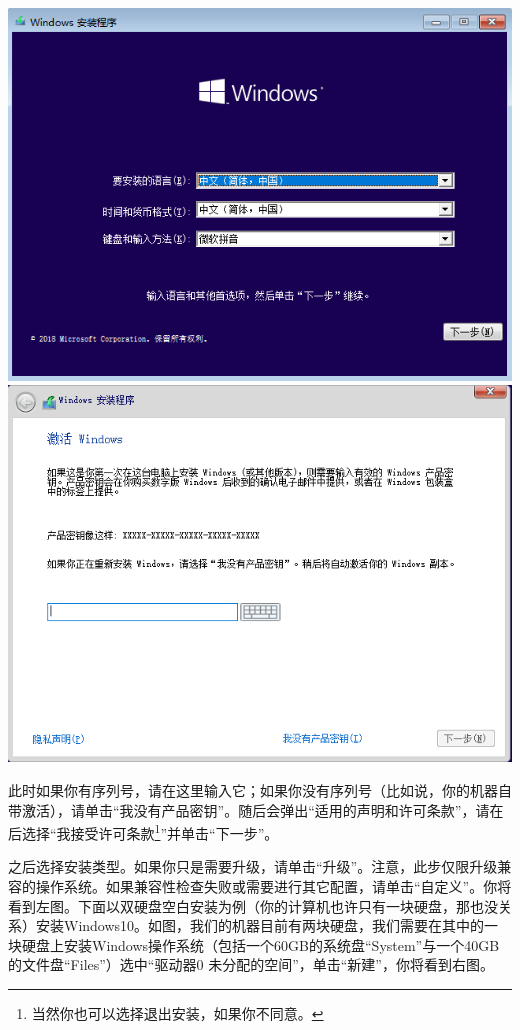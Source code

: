 \documentclass{book}
\begin{document}
\begin{center}
	\includegraphics[scale=0.45]{pic/win10setup2}	\includegraphics[scale=0.45]{pic/win10setup3}
\end{center}
此时如果你有序列号，请在这里输入它；如果你没有序列号（比如说，你的机器自带激活），请单击“我没有产品密钥”。随后会弹出“适用的声明和许可条款”，请在{\color{red}{仔细阅读}}后选择“我接受许可条款\footnote{当然你也可以选择退出安装，如果你不同意。}”并单击“下一步”。\par
之后选择安装类型。如果你只是需要升级，请单击“升级”。注意，此步仅限升级兼容的操作系统。如果兼容性检查失败或需要进行其它配置，请单击“自定义”。你将看到左图。下面以双硬盘空白安装为例（你的计算机也许只有一块硬盘，那也没关系）安装Windows10。如图，我们的机器目前有两块硬盘，我们需要在其中的一块硬盘上安装Windows操作系统（包括一个60GB的系统盘“System”与一个40GB的文件盘“Files”）选中“驱动器0 未分配的空间”，单击“新建”，你将看到右图。
\end{document}
